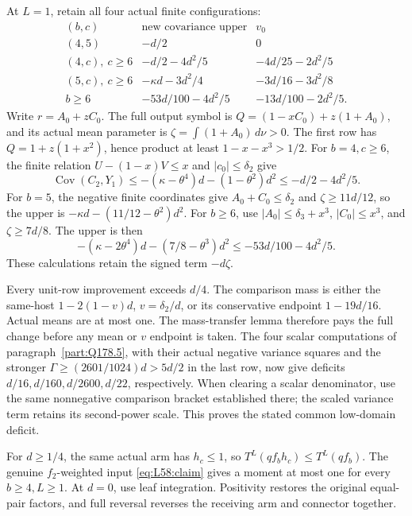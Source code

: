 At \(L=1\), retain all four actual finite configurations:
\begin{equation}\label{eq:Q178:f2-unit-budgets}
\begin{array}{c|c|c}
(b,c)&\text{new covariance upper}&v_0\\\hline
(4,5)&-d/2&0\\
(4,c),\ c\ge6&-d/2-4d^2/5&-4d/25-2d^2/5\\
(5,c),\ c\ge6&-\kappa d-3d^2/4&-3d/16-3d^2/8\\
b\ge6&-53d/100-4d^2/5&-13d/100-2d^2/5.
\end{array}
\end{equation}
Write \(r=A_0+zC_0\). The full output symbol is
\(Q=(1-xC_0)+z(1+A_0)\), and its actual mean parameter is
\(\zeta=\int(1+A_0)\,d\nu>0\).
The first row has \(Q=1+z(1+x^2)\), hence product at least
\(1-x-x^3>1/2\).
For \(b=4,c\ge6\), the finite relation
\(U-(1-x)V\le x\) and \(|c_0|\le\delta_2\) give
\[
 \operatorname{Cov}(C_2,Y_1)
 \le-(\kappa-\theta^4)d-(1-\theta^2)d^2
 \le-d/2-4d^2/5.
\]
For \(b=5\), the negative finite coordinates give
\(A_0+C_0\le\delta_2\) and \(\zeta\ge11d/12\), so the upper
is \(-\kappa d-(11/12-\theta^2)d^2\).
For \(b\ge6\), use
\(|A_0|\le\delta_3+x^3\), \(|C_0|\le x^3\), and
\(\zeta\ge7d/8\). The upper is then
\[
 -(\kappa-2\theta^4)d-(7/8-\theta^3)d^2
 \le-53d/100-4d^2/5.
\]
These calculations retain the signed term \(-d\zeta\).

Every unit-row improvement exceeds \(d/4\). The comparison
mass is either the same-host \(1-2(1-v)d\), \(v=\delta_2/d\),
or its conservative endpoint \(1-19d/16\). Actual means are
at most one. The mass-transfer lemma therefore pays the full
change before any mean or \(v\) endpoint is taken.
The four scalar computations of paragraph~\ref{part:Q178.5},
with their actual negative variance squares and the stronger
\(\Gamma\ge(2601/1024)d>5d/2\) in the last row, now give
deficits \(d/16,d/160,d/2600,d/22\), respectively.
When clearing a scalar denominator, use the same nonnegative
comparison bracket established there; the scaled variance term
retains its second-power scale. This proves the stated common
low-domain deficit.

For \(d\ge1/4\), the same actual arm has \(h_c\le1\), so
\(T^L(qf_bh_c)\le T^L(qf_b)\). The genuine \(f_2\)-weighted
input \eqref{eq:L58:claim} gives a moment at most one for every
\(b\ge4,L\ge1\). At \(d=0\), use leaf integration.
Positivity restores the original equal-pair factors, and full
reversal reverses the receiving arm and connector together.
